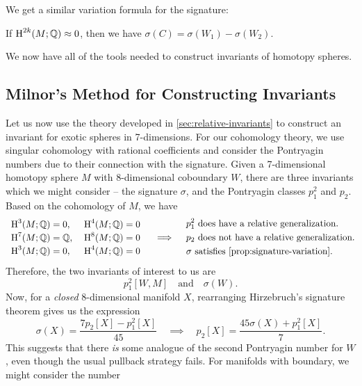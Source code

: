 We get a similar variation formula for the signature:

\begin{proposition}\label{prop:signature-variation}
	If $\operatorname{H}^{2k}(M; \mathbb{Q})\approx 0$, then we have $\sigma(C)=\sigma(W_1)-\sigma(W_2)$.
\end{proposition}

We now have all of the tools needed to construct invariants of homotopy spheres.

\subsection{Milnor's Method for Constructing Invariants}\label{sec:milnor-method}

Let us now use the theory developed in \cref{sec:relative-invariants} to construct an invariant for exotic spheres in 7-dimensions. For our cohomology theory, we use singular cohomology with rational coefficients and consider the Pontryagin numbers due to their connection with the signature.
Given a 7-dimensional homotopy sphere $M$ with 8-dimensional coboundary $W$, there are three invariants which we might consider -- the signature $\sigma$, and the Pontryagin classes $p_1^2$ and $p_2$.
Based on the cohomology of $M$, we have
\[
	\renewcommand{\arraystretch}{1.2}
	\begin{array}{r@{\;}l@{\;}l@{\;}}
		\H^3(M; \Q)&=0,  & \quad \H^4(M; \Q)=0 \\
		\H^7(M; \Q)&=\Q, & \quad \H^8(M; \Q)=0 \\
		\H^3(M; \Q)&=0,  & \quad \H^4(M; \Q)=0
	\end{array}
	\quad\implies\quad
	\begin{aligned}
		 & p_1^2\textrm{ does have a relative generalization.}        \\
		 & p_2\textrm{ does not have a relative generalization.}      \\
		 & \sigma\textrm{ satisfies \cref{prop:signature-variation}.}
	\end{aligned}
\]
Therefore, the two invariants of interest to us are
\[
	p_1^2[W,M]
	\quad\textrm{and}\quad
	\sigma(W).
\]
Now, for a \emph{closed} $8$-dimensional manifold $X$, rearranging Hirzebruch's signature theorem gives us the expression
\begin{equation}\label{eq:7-manifold_rearrangement}
	\sigma(X) = \frac{7p_2[X] - p_1^2[X]}{45}
	\quad\implies\quad
	p_2[X] = \frac{45\sigma(X) + p_1^2[X]}{7}.
\end{equation}
This suggests that there \emph{is} some analogue of the second Pontryagin number for $W$, even though the usual pullback strategy fails. For manifolds with boundary, we might consider the number
